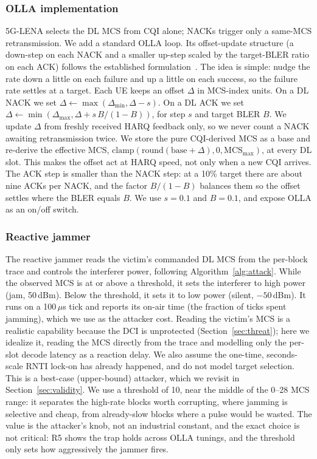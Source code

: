 \documentclass[conference]{IEEEtran}
\begin{document}
\subsubsection{OLLA implementation}
5G-LENA selects the DL MCS from CQI alone; NACKs trigger only a same-MCS
retransmission. We add a standard OLLA loop. Its offset-update structure (a down-step on
each NACK and a smaller up-step scaled by the target-BLER ratio on each ACK) follows the
established formulation~\cite{sampath1997olla,blanquez2016eolla}. The idea is simple:
nudge the rate down a little on each failure and up a little on each success, so the
failure rate settles at a target. Each UE keeps an offset $\Delta$ in MCS-index units. On a DL NACK we set $\Delta \leftarrow \max(\Delta_{\min},
\Delta - s)$. On a DL ACK we set $\Delta \leftarrow \min(\Delta_{\max}, \Delta +
s\,B/(1-B))$, for step $s$ and target BLER $B$. We update $\Delta$ from freshly
received HARQ feedback only, so we never count a NACK awaiting retransmission twice. We
store the pure CQI-derived MCS as a base and re-derive the effective MCS,
$\mathrm{clamp}(\mathrm{round}(\mathrm{base}+\Delta),0,\mathrm{MCS}_{\max})$, at every
DL slot. This makes the offset act at HARQ speed, not only when a new CQI arrives. The
ACK step is smaller than the NACK step: at a 10\% target there are about nine ACKs per
NACK, and the factor $B/(1-B)$ balances them so the offset settles where the BLER equals
$B$. We use $s=0.1$ and $B=0.1$, and expose OLLA as an on/off switch.

\subsubsection{Reactive jammer}
The reactive jammer reads the victim's commanded DL MCS from the per-block trace and
controls the interferer power, following Algorithm~\ref{alg:attack}. While the observed
MCS is at or above a threshold, it sets the interferer to high power (jam, 50\,dBm).
Below the threshold, it sets it to low power (silent, $-50$\,dBm). It runs on a
100\,$\mu$s tick and reports its on-air time (the fraction of ticks spent jamming), which
we use as the attacker cost. Reading the victim's MCS is a realistic capability because
the DCI is unprotected (Section~\ref{sec:threat}); here we idealize it, reading the MCS
directly from the trace and modelling only the per-slot decode latency as a reaction delay.
We also assume the one-time, seconds-scale RNTI lock-on has already happened, and do not
model target selection. This is a best-case (upper-bound) attacker, which we revisit in
Section~\ref{sec:validity}. We use a threshold of 10, near the
middle of the 0--28 MCS range: it separates the high-rate blocks worth corrupting, where
jamming is selective and cheap, from already-slow blocks where a pulse would be wasted.
The value is the attacker's knob, not an industrial constant, and the exact choice is not
critical: R5 shows the trap holds across OLLA tunings, and the threshold only sets how
aggressively the jammer fires.
\end{document}
